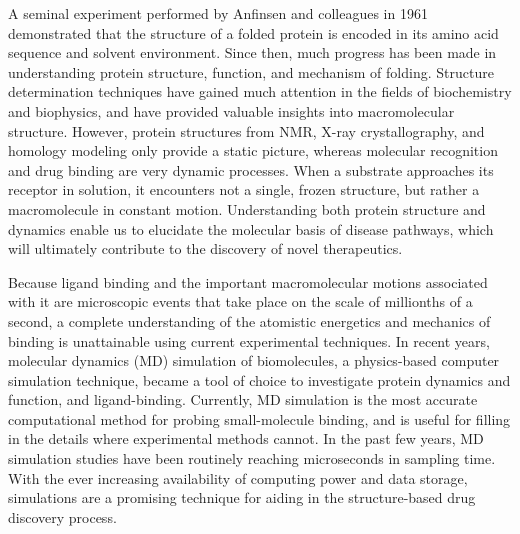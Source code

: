 A seminal experiment performed by Anfinsen and colleagues in 1961 demonstrated that the structure of a folded protein is encoded in its amino acid sequence and solvent environment.  Since then, much progress has been made in understanding protein structure, function, and mechanism of folding.  Structure determination techniques have gained much attention in the fields of biochemistry and biophysics, and have provided valuable insights into macromolecular structure. However, protein structures from NMR, X-ray crystallography, and homology modeling only provide a static picture, whereas molecular recognition and drug binding are very dynamic processes. When a substrate approaches its receptor in solution, it encounters not a single, frozen structure, but rather a macromolecule in constant motion. Understanding both protein structure and dynamics enable us to elucidate the molecular basis of disease pathways, which will ultimately contribute to the discovery of novel therapeutics. 

Because ligand binding and the important macromolecular motions associated with it are microscopic events that take place on the scale of millionths of a second, a complete understanding of the atomistic energetics and mechanics of binding is unattainable using current experimental techniques. In recent years, molecular dynamics (MD) simulation of biomolecules, a physics-based computer simulation technique, became a tool of choice to investigate protein dynamics and function, and ligand-binding. Currently, MD simulation is the most accurate computational method for probing small-molecule binding, and is useful for filling in the details where experimental methods cannot.\cite{Durrant:2011bm} In the past few years, MD simulation studies have been routinely reaching microseconds in sampling time. With the ever increasing availability of computing power and data storage, simulations are a promising technique for aiding in the structure-based drug discovery process. 

